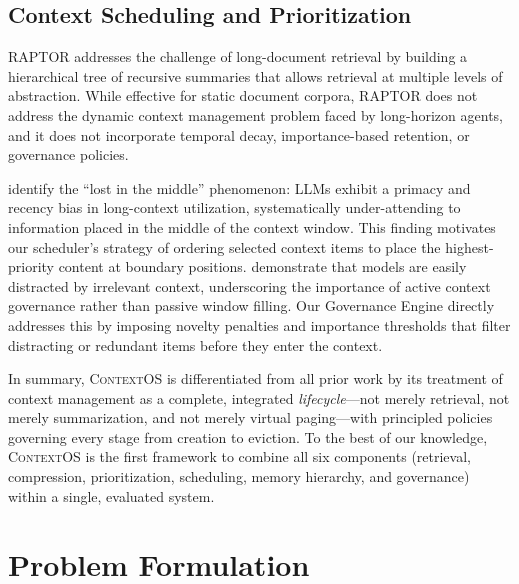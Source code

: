 \documentclass[review,12pt]{elsarticle}
\newcommand{\contextos}{\textsc{ContextOS}}
\begin{document}
\subsection{Context Scheduling and Prioritization}
\label{subsec:scheduling}

RAPTOR \citep{sarthi2024raptor} addresses the challenge of long-document
retrieval by building a hierarchical tree of recursive summaries that allows
retrieval at multiple levels of abstraction.  While effective for static
document corpora, RAPTOR does not address the dynamic context management
problem faced by long-horizon agents, and it does not incorporate temporal
decay, importance-based retention, or governance policies.

\citet{liu2023lost} identify the ``lost in the middle'' phenomenon: LLMs
exhibit a primacy and recency bias in long-context utilization, systematically
under-attending to information placed in the middle of the context window.
This finding motivates our scheduler's strategy of ordering selected context
items to place the highest-priority content at boundary positions.
\citet{shi2023large} demonstrate that models are easily distracted by
irrelevant context, underscoring the importance of active context governance
rather than passive window filling.  Our Governance Engine directly addresses
this by imposing novelty penalties and importance thresholds that filter
distracting or redundant items before they enter the context.

In summary, \contextos{} is differentiated from all prior work by its treatment
of context management as a complete, integrated \emph{lifecycle}—not merely
retrieval, not merely summarization, and not merely virtual paging—with
principled policies governing every stage from creation to eviction.  To the
best of our knowledge, \contextos{} is the first framework to combine all six
components (retrieval, compression, prioritization, scheduling, memory
hierarchy, and governance) within a single, evaluated system.

\section{Problem Formulation}
\label{sec:formulation}
\end{document}
